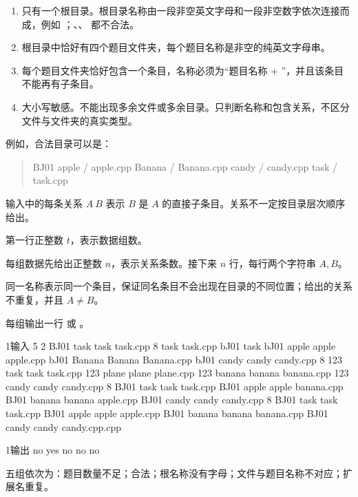 \documentclass[11pt,a4paper]{article}
\begin{document}
\begin{enumerate}
\item 只有一个根目录。根目录名称由一段非空英文字母和一段非空数字依次连接而成，例如 \texttt{}；\texttt{}、\texttt{}、\texttt{} 都不合法。
\item 根目录中恰好有四个题目文件夹，每个题目名称是非空的纯英文字母串。
\item 每个题目文件夹恰好包含一个条目，名称必须为“题目名称 + \texttt{}”，并且该条目不能再有子条目。
\item 大小写敏感。不能出现多余文件或多余目录。只判断名称和包含关系，不区分文件与文件夹的真实类型。
\end{enumerate}

例如，合法目录可以是：

\begin{quote}\ttfamily
BJ01
  apple / apple.cpp
  Banana / Banana.cpp
  candy / candy.cpp
  task / task.cpp
\end{quote}

输入中的每条关系 $A\ B$ 表示 $B$ 是 $A$ 的直接子条目。关系不一定按目录层次顺序给出。


第一行正整数 $t$，表示数据组数。

每组数据先给出正整数 $n$，表示关系条数。接下来 $n$ 行，每行两个字符串 $A,B$。

同一名称表示同一个条目，保证同名条目不会出现在目录的不同位置；给出的关系不重复，并且 $A\ne B$。


每组输出一行 \texttt{} 或 \texttt{}。

\begin{OISample}{1}{输入}
5
2
BJ01 task
task task.cpp
8
task task.cpp
bJ01 task
bJ01 apple
apple apple.cpp
bJ01 Banana
Banana Banana.cpp
bJ01 candy
candy candy.cpp
8
123 task
task task.cpp
123 plane
plane plane.cpp
123 banana
banana banana.cpp
123 candy
candy candy.cpp
8
BJ01 task
task task.cpp
BJ01 apple
apple banana.cpp
BJ01 banana
banana apple.cpp
BJ01 candy
candy candy.cpp
8
BJ01 task
task task.cpp
BJ01 apple
apple apple.cpp
BJ01 banana
banana banana.cpp
BJ01 candy
candy candy.cpp.cpp
\end{OISample}
\begin{OISample}{1}{输出}
no
yes
no
no
no
\end{OISample}

五组依次为：题目数量不足；合法；根名称没有字母；文件与题目名称不对应；扩展名重复。
\end{document}
